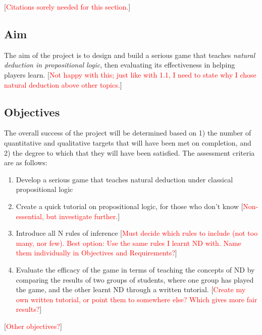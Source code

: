 \documentclass[a4paper]{article}
\newcommand{\comment}[1]{[\textcolor{red}{#1}]} %
\begin{document}
\comment{Citations sorely needed for this section.}

\subsection{Aim}
The aim of the project is to design and build a serious game that teaches \emph{natural deduction in propositional logic}, then evaluating its effectiveness in helping players learn. \comment{Not happy with this; just like with 1.1, I need to state why I chose natural deduction above other topics.}

\subsection{Objectives}
The overall success of the project will be determined based on 1) the number of quantitative and qualitative targets that will have been met on completion, and 2) the degree to which that they will have been satisfied. The assessment criteria are as follows:
\begin{enumerate}
  \item Develop a serious game that teaches natural deduction under classical propositional logic
  \item Create a quick tutorial on propositional logic, for those who don't know \comment{Non-essential, but investigate further.}
  \item Introduce all N rules of inference \comment{Must decide which rules to include (not too many, nor few). Best option: Use the same rules I learnt ND with. Name them individually in Objectives and Requirements?}
  \item Evaluate the efficacy of the game in terms of teaching the concepts of ND by comparing the results of two groups of students, where one group has played the game, and the other learnt ND through a written tutorial. \comment{Create my own written tutorial, or point them to somewhere else? Which gives more fair results?}
\end{enumerate}
\comment{Other objectives?}
\end{document}
